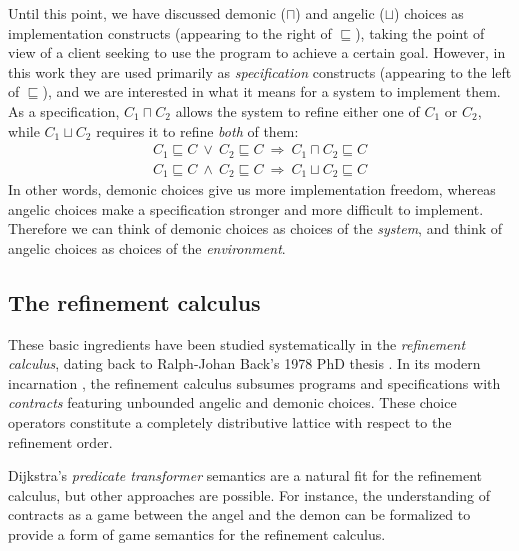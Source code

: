 \documentclass[draft,11pt]{report}
\begin{document}
Until this point,
we have discussed demonic ($\sqcap$) and angelic ($\sqcup$) choices
as implementation constructs
(appearing to the right of $\sqsubseteq$),
taking the point of view of a client
seeking to use the program to achieve a certain goal.
However,
in this work they are used primarily
as \emph{specification} constructs
(appearing to the left of $\sqsubseteq$),
and we are interested in what it means
for a system to implement them.
%
As a specification, $C_1 \sqcap C_2$
allows the system to refine either one of $C_1$ or $C_2$, while
$C_1 \sqcup C_2$ requires it to refine
\emph{both} of them:
\begin{gather*}
  C_1 \sqsubseteq C \: \vee \: C_2 \sqsubseteq C
    \: \Rightarrow \: C_1 \sqcap C_2 \sqsubseteq C \\
  C_1 \sqsubseteq C \: \wedge \: C_2 \sqsubseteq C
    \: \Rightarrow \: C_1 \sqcup C_2 \sqsubseteq C 
\end{gather*}
In other words,
demonic choices
give us more
implementation freedom,
whereas angelic choices make a specification
stronger and more difficult to implement.
Therefore we can think of demonic choices as
choices of the \emph{system}, %
and think of angelic choices as
choices of the \emph{environment}.


\subsection{The refinement calculus} %

These basic ingredients have been studied systematically
in the \emph{refinement calculus},
dating back to Ralph-Johan Back's 1978 PhD thesis \citep{backthesis}.
In its modern incarnation \citep{refcal},
the refinement calculus
subsumes programs and specifications with \emph{contracts}
featuring unbounded angelic and demonic choices.
These choice operators
constitute a completely distributive lattice
with respect to the refinement order.

Dijkstra's \emph{predicate transformer} semantics \citep{gc}
are a natural fit for the refinement calculus,
but other approaches are possible.
For instance,
the understanding of contracts as a game between
the angel and the demon
can be formalized to provide a form of
game semantics for the refinement calculus.
\end{document}
